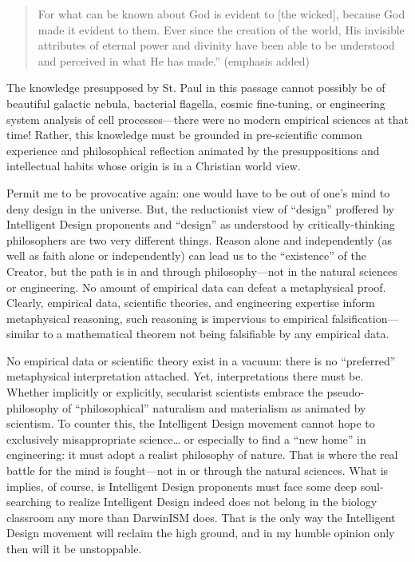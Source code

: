 \begin{quote}
For what can be known about God is evident to [the wicked], because God made it evident to them. Ever since the creation of the world, His invisible attributes of eternal power and divinity have been able to be understood and perceived in what He has made.” (emphasis added)
\end{quote}

The knowledge presupposed by St. Paul in this passage cannot possibly be of beautiful galactic nebula, bacterial flagella, cosmic fine-tuning, or engineering system analysis of cell processes—there were no modern empirical sciences at that time! Rather, this knowledge must be grounded in pre-scientific common experience and philosophical reflection animated by the presuppositions and intellectual habits whose origin is in a Christian world view.

Permit me to be provocative again: one would have to be out of one’s mind to deny design in the universe. But, the reductionist view of “design” proffered by Intelligent Design proponents and “design” as understood by critically-thinking philosophers are two very different things. Reason alone and independently (as well as faith alone or independently) can lead us to the “existence” of the Creator, but the path is in and through philosophy—not in the natural sciences or engineering. No amount of empirical data can defeat a metaphysical proof. Clearly, empirical data, scientific theories, and engineering expertise inform metaphysical reasoning, such reasoning is impervious to empirical falsification—similar to a mathematical theorem not being falsifiable by any empirical data.

No empirical data or scientific theory exist in a vacuum: there is no “preferred” metaphysical interpretation attached. Yet, interpretations there must be. Whether implicitly or explicitly, secularist scientists embrace the pseudo-philosophy of “philosophical” naturalism and materialism as animated by scientism. To counter this, the Intelligent Design movement cannot hope to exclusively misappropriate science… or especially to find a “new home” in engineering: it must adopt a realist philosophy of nature. That is where the real battle for the mind is fought—not in or through the natural sciences. What is implies, of course, is Intelligent Design proponents must face some deep soul-searching to realize Intelligent Design indeed does not belong in the biology classroom any more than DarwinISM does. That is the only way the Intelligent Design movement will reclaim the high ground, and in my humble opinion only then will it be unstoppable.

